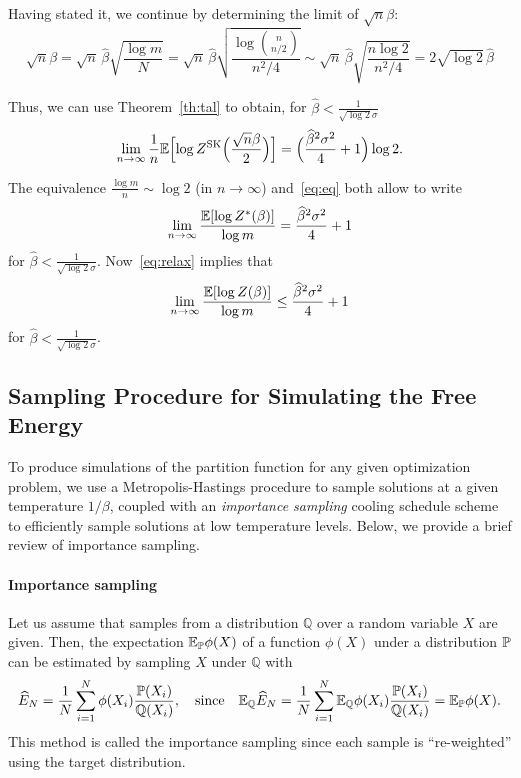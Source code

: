 Having stated it, we continue by determining the limit of $\sqrt{n}\beta$:
\begin{equation}
  \sqrt{n}\beta
    = \sqrt{n} \, \hat{\beta}\sqrt{\frac{\log m}{N}}
      = \sqrt{n} \, \hat{\beta}\sqrt{\frac{\log\binom{n}{n/2}}{n^2 / 4}}
    \sim \sqrt{n} \, \hat{\beta}\sqrt{\frac{n\log 2}{n^2 / 4}}
      = 2 \sqrt{\log 2} \, \hat{\beta}
\end{equation}

Thus, we can use Theorem~\ref{th:tal} to obtain, for $\hat{\beta} < \frac{1}{\sqrt{\log 2}\sigma}$
\begin{equation}
  \lim_{n\to\infty}\frac{1}{n}\mathbb{E} \Bigl[\log Z^{\text{SK}}\Bigl(\frac{\sqrt{n}\beta}{2}\Bigr)\Bigr]
    = \Bigl(\frac{\widehat{\beta}^2\sigma^2}{4} + 1\Bigr)\log 2.
\end{equation}

The equivalence $\frac{\log m}{n} \sim \log 2$ (in $n \to \infty$) and~\eqref{eq:eq}
both allow to write
\begin{equation}
  \lim_{n\to\infty}\frac{\mathbb{E}[\log Z^*(\beta)]}{\log m}
    = \frac{\widehat{\beta}^2\sigma^2}{4} + 1
\end{equation}
for $\hat{\beta} < \frac{1}{\sqrt{\log 2}\sigma}$. Now~\eqref{eq:relax} implies that
\begin{equation}
  \lim_{n\to\infty}\frac{\mathbb{E}[\log Z(\beta)]}{\log m}
    \leq \frac{\widehat{\beta}^2\sigma^2}{4} + 1
\end{equation}
for $\hat{\beta} < \frac{1}{\sqrt{\log 2}\sigma}$.\QEDA

\subsection{Sampling Procedure for Simulating the Free Energy}
\label{sec:free_sampling_scheme}
To produce simulations of the partition function for any given
optimization problem, we use a Metropolis-Hastings procedure to sample
solutions at a given temperature $1/\beta$, coupled with an {\it importance
sampling} cooling schedule scheme to efficiently sample solutions at
low temperature levels.  Below, we provide a brief review of
importance sampling.
\parsec
{}
\paragraph{Importance sampling} Let us assume that samples from a
distribution $\mathbb{Q}$ over a random variable $X$ are given.  Then,
the expectation ${\mathbb{E}}_{{\mathbb{P}}} \phi(X)$ of a function $\phi(X)$ under a
distribution ${\mathbb{P}}$ can be estimated by sampling $X$ under
$\mathbb{Q}$ with
\begin{equation}
  \widehat{E}_N = \frac{1}{N}\sum_{i=1}^N \phi(X_i) \frac{{\mathbb{P}}(X_i)}{\mathbb{Q}(X_i)},\quad
  \text{since} \quad
  {\mathbb{E}}_{\mathbb{Q}}\widehat{E}_N =
  \frac{1}{N}\sum_{i=1}^N {\mathbb{E}}_{\mathbb{Q}} \phi(X_i) \frac{{\mathbb{P}}(X_i)}{\mathbb{Q}(X_i)}
  = {\mathbb{E}}_{{\mathbb{P}}} \phi(X).
\end{equation}
This method is called the importance sampling since each sample is
``re-weighted'' using the target distribution.


